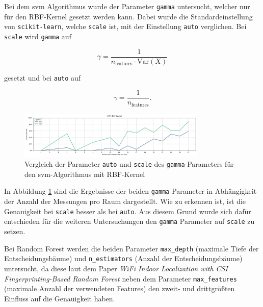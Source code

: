 Bei dem \gls{svm} Algorithmus wurde der Parameter \texttt{gamma} untersucht, welcher nur für den RBF-Kernel gesetzt werden kann. Dabei wurde die Standardeinstellung von \texttt{scikit-learn}, welche \texttt{scale} ist, mit der Einstellung \texttt{auto} verglichen. Bei \texttt{scale} wird \texttt{gamma} auf

\begin{equation}
    \gamma = \frac{1}{n_{\text{features}} \cdot \text{Var}(X)}
\end{equation}

gesetzt und bei \texttt{auto} auf

\begin{equation}
    \gamma = \frac{1}{n_{\text{features}}}.
\end{equation}


\begin{figure}[H]
    \centering
    \includegraphics[width=0.8\textwidth]{images/02_svm_gamma_value_01.png}
    \caption{Vergleich der Parameter \texttt{auto} und \texttt{scale} des \texttt{gamma}-Parameters für den \gls{svm}-Algorithmus mit RBF-Kernel}
    \label{fig:1_best_parameters_svm_01}
\end{figure}

In Abbildung \ref{fig:1_best_parameters_svm_01} sind die Ergebnisse der beiden \texttt{gamma} Parameter in Abhängigkeit der Anzahl der Messungen pro Raum dargestellt. Wie zu erkennen ist, ist die Genauigkeit bei \texttt{scale} besser als bei \texttt{auto}. Aus diesem Grund wurde sich dafür entschieden für die weiteren Untersuchungen den \texttt{gamma} Parameter auf \texttt{scale} zu setzen.



Bei Random Forest werden die beiden Parameter \texttt{max\_depth} (maximale Tiefe der Entscheidungsbäume) und \texttt{n\_estimators} (Anzahl der Entscheidungsbäume) untersucht, da diese laut dem Paper \textit{WiFi Indoor Localization with CSI Fingerprinting-Based Random Forest} neben dem Parameter \texttt{max\_features} (maximale Anzahl der verwendeten Features) den zweit- und drittgrößten Einfluss auf die Genauigkeit haben.


